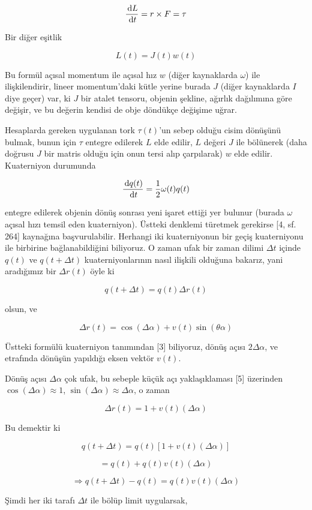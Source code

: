 \documentclass[12pt,fleqn]{article}\usepackage{../../common}
\begin{document}
$$
\frac{\,\mathrm{d} L}{\,\mathrm{d} t} = r \times F = \tau
$$

Bir diğer eşitlik

$$
L(t) = J(t) w(t)
$$

Bu formül açısal momentum ile açısal hız $w$ (diğer kaynaklarda $\omega$) ile
ilişkilendirir, lineer momentum'daki kütle yerine burada $J$ (diğer kaynaklarda
$I$ diye geçer) var, ki $J$ bir atalet tensoru, objenin şekline, ağırlık
dağılımına göre değişir, ve bu değerin kendisi de obje döndükçe değişime uğrar.

Hesaplarda gereken uygulanan tork $\tau(t)$'un sebep olduğu cisim dönüşünü
bulmak, bunun için $\tau$ entegre edilerek $L$ elde edilir, $L$ değeri $J$ ile
bölünerek (daha doğrusu $J$ bir matris olduğu için onun tersi alıp çarpılarak)
$w$ elde edilir. Kuaterniyon durumunda

$$
\frac{\,\mathrm{d} q(t)}{\,\mathrm{d} t} = \frac{1}{2} \omega(t) q(t)
$$

entegre edilerek objenin dönüş sonrası yeni işaret ettiği yer bulunur (burada
$\omega$ açısal hızı temsil eden kuaterniyon). Üstteki denklemi türetmek
gerekirse [4, sf. 264] kaynağına başvurulabilir. Herhangi iki kuaterniyonun bir
geçiş kuaterniyonu ile birbirine bağlanabildiğini biliyoruz. O zaman ufak bir
zaman dilimi $\Delta t$ içinde $q(t)$ ve $q(t + \Delta t)$ kuaterniyonlarının
nasıl ilişkili olduğuna bakarız, yani aradığımız bir $\Delta r(t)$ öyle ki

$$
q(t + \Delta t) = q(t) \Delta r(t)
$$

olsun, ve

$$
\Delta r(t) = \cos (\Delta \alpha) + v(t) \sin(\theta \alpha)
$$

Üstteki formülü kuaterniyon tanımından [3] biliyoruz, dönüş açısı $2 \Delta
\alpha$, ve etrafında dönüşün yapıldığı eksen vektör $v(t)$.

Dönüş açısı $\Delta \alpha$ çok ufak, bu sebeple küçük açı yaklaşıklaması [5]
üzerinden $\cos(\Delta \alpha) \approx 1$, $\sin(\Delta \alpha) \approx \Delta
\alpha$, o zaman

$$
\Delta r(t) = 1 + v(t) (\Delta \alpha)
$$

Bu demektir ki

$$
q(t + \Delta t) = q(t) [1 + v(t) (\Delta \alpha)]
$$

$$
 = q(t)  + q(t) v(t) (\Delta \alpha)
$$

$$
\Rightarrow q(t + \Delta t) - q(t) = q(t) v(t) (\Delta \alpha)
$$

Şimdi her iki tarafı $\Delta t$ ile bölüp limit uygularsak,
\end{document}
